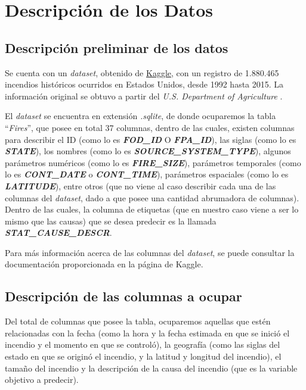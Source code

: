 \section{Descripción de los Datos} \label{descr-datos}

\subsection{Descripción preliminar de los datos}

Se cuenta con un \textit{dataset}, obtenido de \href{https://www.kaggle.com/rtatman/188-million-us-wildfires}{Kaggle}, con un registro de 1.880.465 incendios históricos ocurridos en Estados Unidos, desde 1992 hasta 2015. La información original se obtuvo a partir del \textit{U.S. Department of Agriculture} \cite{FPA}.

El \textit{dataset} se encuentra en extensión \textit{.sqlite}, de donde ocuparemos la tabla ``\textit{Fires}'', que posee en total 37 columnas, dentro de las cuales, existen columnas para describir el ID (como lo es \textit{\textbf{FOD\_ID}} O \textit{\textbf{FPA\_ID}}), las siglas (como lo es \textit{\textbf{STATE}}), los nombres (como lo es \textit{\textbf{SOURCE\_SYSTEM\_TYPE}}), algunos parámetros numéricos (como lo es \textit{\textbf{FIRE\_SIZE}}), parámetros temporales (como lo es \textit{\textbf{CONT\_DATE}} o \textit{\textbf{CONT\_TIME}}), parámetros espaciales (como lo es \textit{\textbf{LATITUDE}}), entre otros (que no viene al caso describir cada una de las columnas del \textit{dataset}, dado a que posee una cantidad abrumadora de columnas). Dentro de las cuales, la columna de etiquetas (que en nuestro caso viene a ser lo mismo que las causas) que se desea predecir es la llamada \textit{\textbf{STAT\_CAUSE\_DESCR}}.

Para más información acerca de las columnas del \textit{dataset}, se puede consultar la documentación proporcionada en la página de Kaggle.

\subsection{Descripción de las columnas a ocupar}

Del total de columnas que posee la tabla, ocuparemos aquellas que estén relacionadas con la fecha (como la hora y la fecha estimada en que se inició el incendio y el momento en que se controló), la geografía (como las siglas del estado en que se originó el incendio, y la latitud y longitud del incendio), el tamaño del incendio y la descripción de la causa del incendio (que es la variable objetivo a predecir). 

